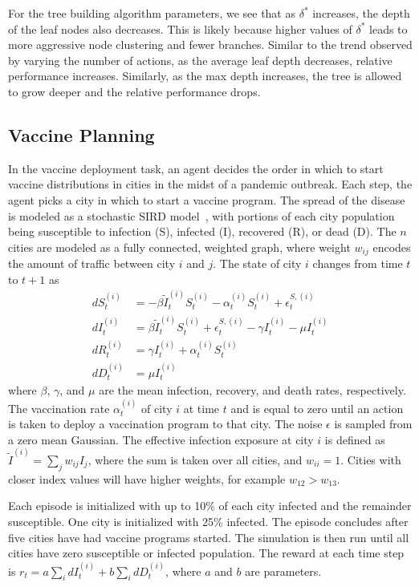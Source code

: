 \documentclass[letterpaper]{article} %
\begin{document}
For the tree building algorithm parameters, we see that as $\delta^*$ increases, the depth of the leaf nodes also decreases.
This is likely because higher values of $\delta^*$ leads to more aggressive node clustering and fewer branches.
Similar to the trend observed by varying the number of actions, as the average leaf depth decreases, relative performance increases.
Similarly, as the max depth increases, the tree is allowed to grow deeper and the relative performance drops.

\subsection{Vaccine Planning}
In the vaccine deployment task, an agent decides the order in which to start vaccine distributions in cities in the midst of a pandemic outbreak.
Each step, the agent picks a city in which to start a vaccine program.
The spread of the disease is modeled as a stochastic SIRD model~\cite{bailey1975}, with portions of each city population being susceptible to infection (S), infected (I), recovered (R), or dead (D).
The $n$ cities are modeled as a fully connected, weighted graph, where weight $w_{ij}$ encodes the amount of traffic between city $i$ and $j$.
The state of city $i$ changes from time $t$ to $t+1$ as
\begin{align}
    dS^{(i)}_{t} &= -\beta \tilde{I}^{(i)}_t S^{(i)}_t - \alpha^{(i)}_t S^{(i)}_t +\epsilon^{S, (i)}_t \\
    dI^{(i)}_{t} &= \beta \tilde{I}^{(i)}_t S^{(i)}_t +\epsilon^{S, (i)}_t - \gamma I^{(i)}_t - \mu I^{(i)}_t \\
    dR^{(i)}_{t} &= \gamma I^{(i)}_t + \alpha^{(i)}_t S^{(i)}_t \\
    dD^{(i)}_{t} &= \mu I^{(i)}_t
\end{align}
where $\beta$, $\gamma$, and $\mu$ are the mean infection, recovery, and death rates, respectively.
The vaccination rate $\alpha^{(i)}_{t}$ of city $i$ at time $t$ and is equal to zero until an action is taken to deploy a vaccination program to that city.
The noise $\epsilon$ is sampled from a zero mean Gaussian.
The effective infection exposure at city $i$ is defined as $\tilde{I}^{(i)} = \sum_j w_{ij}I_j$, where the sum is taken over all cities, and $w_{ii} = 1$.
Cities with closer index values will have higher weights, for example $w_{12} > w_{13}$.

Each episode is initialized with up to 10\% of each city infected and the remainder susceptible.
One city is initialized with 25\% infected.
The episode concludes after five cities have had vaccine programs started.
The simulation is then run until all cities have zero susceptible or infected population.
The reward at each time step is $ r_t = a \sum_i dI^{(i)}_t + b \sum_i dD^{(i)}_t $, where $a$ and $b$ are parameters.
\end{document}
